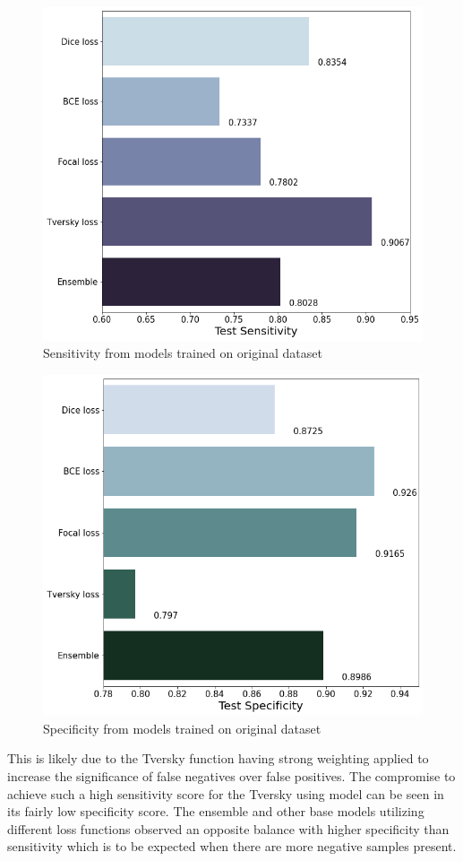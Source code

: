\documentclass[conference]{IEEEtran}
\begin{document}
\begin{figure}[tp]
  \centering
  \includegraphics[scale=0.2]{original_data_sensitivity.png}
  \caption{Sensitivity from models trained on original dataset}
  \label{original_data_sensitivity}
\end{figure}
\begin{figure}[tp]
  \centering
  \includegraphics[scale=0.2]{original_data_specificity.png}
  \caption{Specificity from models trained on original dataset}
  \label{original_data_specificity}
\end{figure}
This is likely due to the Tversky function having strong weighting applied to
increase the significance of false negatives over false positives.  The
compromise to achieve such a high sensitivity score for the Tversky using
model can be seen in its fairly low specificity score.  The ensemble and other
base models utilizing different loss functions observed an opposite balance
with higher specificity than sensitivity which is to be expected when there are
more negative samples present.
\end{document}
